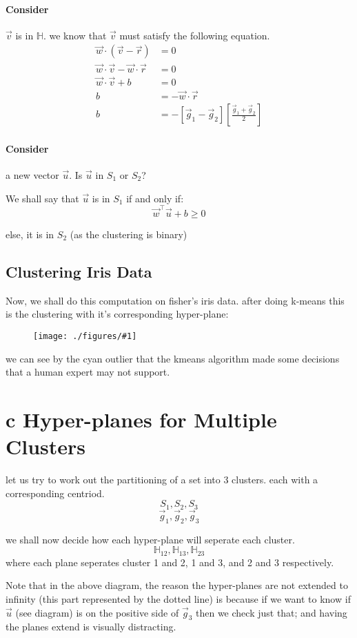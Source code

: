 \documentclass[12pt]{book}
\newcommand{\incimg}[2]{%
       \begin{figure}[h]
               \centering
               \texttt{[image: ./figures/\#1]}
       \end{figure}
}
\begin{document}
\paragraph{Consider}
$\vec v$ is in $\mathbb{H}$. we know that $\vec v$ must satisfy the following
equation.
\begin{align*}
        \vec w \cdot (\vec v - \vec r) &= 0\\
        \vec w \cdot \vec v - \vec w \cdot \vec r &= 0\\
        \vec w \cdot \vec v + b &= 0\\
         b &= -\vec w \cdot \vec r\\
         b &= -[\vec g_1 - \vec g_2][\frac{\vec g_1 + \vec g_2}{2}]
\end{align*}

\paragraph{Consider}
a new vector $\vec u$. Is $\vec u$ in $S_1$ or $S_2$?

We shall say that $\vec u$ is in $S_1$ if and only if:
\[\vec w^\top \vec u + b \geq 0\]

else, it is in $S_2$ (as the clustering is binary)

\subsection*{Clustering Iris Data}
Now, we shall do this computation on fisher's iris data. after doing k-means
this is the clustering with it's corresponding hyper-plane:

\incimg{iris}{1.2}

we can see by the cyan outlier that the kmeans algorithm made some decisions 
that a human expert may not support.

\section*{c Hyper-planes for Multiple Clusters}
let us try to work out the partitioning of a set into 3 clusters. each with a
corresponding centriod.
\[S_1, S_2, S_3\]
\[\vec g_1, \vec g_2, \vec g_3\]

we shall now decide how each hyper-plane will seperate each cluster.
\[\mathbb{H}_{12}, \mathbb{H}_{13}, \mathbb{H}_{23}\]
where each plane seperates cluster 1 and 2, 1 and 3, and 2 and 3 respectively.

Note that in the above diagram, the reason the hyper-planes are not extended to 
infinity (this part represented by the dotted line) is because if we want to 
know if $\vec u$ (see diagram) is on the positive side of $\vec g_3$ then we
check just that; and having the planes extend is visually distracting.
\end{document}
